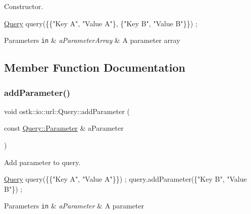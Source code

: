 Constructor. 


\begin{DoxyCode}
\hyperlink{classostk_1_1io_1_1url_1_1_query_a10299b6b445c39886d6b689c14364fe1}{Query} query(\{\{\textcolor{stringliteral}{"Key A"}, \textcolor{stringliteral}{"Value A"}\}, \{\textcolor{stringliteral}{"Key B"}, \textcolor{stringliteral}{"Value B"}\}\}) ;
\end{DoxyCode}



\begin{DoxyParams}[1]{Parameters}
\mbox{\tt in}  & {\em a\+Parameter\+Array} & A parameter array \\
\hline
\end{DoxyParams}


\subsection{Member Function Documentation}
\mbox{\label{classostk_1_1io_1_1url_1_1_query_a9937aa1e0a99c2f2fd78ec9795f1f2df}} 
\subsubsection{\texorpdfstring{add\+Parameter()}{addParameter()}}
{\footnotesize\ttfamily void ostk\+::io\+::url\+::\+Query\+::add\+Parameter (\begin{DoxyParamCaption}\item[{const \hyperlink{classostk_1_1io_1_1url_1_1_query_1_1_parameter}{Query\+::\+Parameter} \&}]{a\+Parameter }\end{DoxyParamCaption})}



Add parameter to query. 


\begin{DoxyCode}
\hyperlink{classostk_1_1io_1_1url_1_1_query_a10299b6b445c39886d6b689c14364fe1}{Query} query(\{\{\textcolor{stringliteral}{"Key A"}, \textcolor{stringliteral}{"Value A"}\}\}) ;
query.addParameter(\{\textcolor{stringliteral}{"Key B"}, \textcolor{stringliteral}{"Value B"}\}) ;
\end{DoxyCode}



\begin{DoxyParams}[1]{Parameters}
\mbox{\tt in}  & {\em a\+Parameter} & A parameter \\
\hline
\end{DoxyParams}
\mbox{\label{classostk_1_1io_1_1url_1_1_query_a6c40e85de4a1a42ec5c8ee268e074e6f}} 
